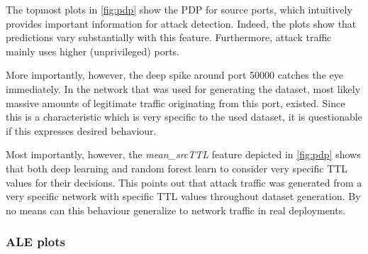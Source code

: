 \documentclass[10pt,sigconf,letterpaper,dvipsnames]{acmart}
\begin{document}
The topmost plots in \autoref{fig:pdp} show the PDP for source ports, which intuitively provides important information for attack detection. Indeed, the plots show that predictions vary substantially with this feature. Furthermore, attack traffic mainly uses higher (unprivileged) ports.

More importantly, however, the deep spike around port 50000 catches the eye immediately. In the network that was used for generating the dataset, most likely massive amounts of legitimate traffic originating from this port, existed.
Since this is a characteristic which is very specific to the used dataset, it is questionable if this expresses desired behaviour.

Most importantly, however, the \textit{mean\_srcTTL} feature depicted in \autoref{fig:pdp} shows that both deep learning and random forest learn to consider very specific TTL values for their decisions. This points out that attack traffic was generated from a very specific network with specific TTL values throughout dataset generation.
By no means can this behaviour generalize to network traffic in real deployments.

\subsubsection{ALE plots}
\end{document}
